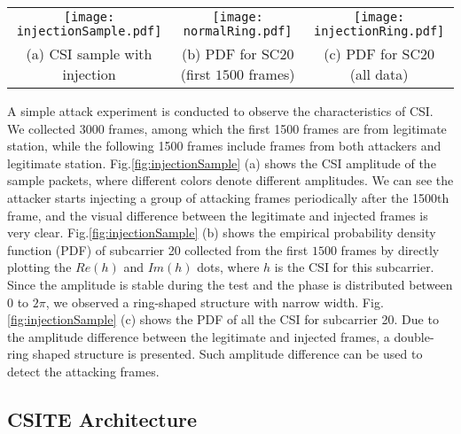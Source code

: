 \documentclass[conference]{IEEEtran}
\begin{document}
\begin{figure*}[!t]
\begin{center}
\begin{tabular}{ccc}
\texttt{[image: injectionSample.pdf]} \hspace{-0.3in} &
\texttt{[image: normalRing.pdf]} \hspace{-0.4in} &
\texttt{[image: injectionRing.pdf]} \\
(a) CSI sample with injection & (b) PDF for SC20 (first $1500$ frames) &
(c) PDF for SC20 (all data)
\end{tabular}
\end{center}
\caption{(a) Amplitude of CSI sample where warmer
  colors denote larger amplitudes. Attacking frames are injected
  starting from frame number $1500$.
(b)  PDF  for sub-carrier 20 of the first $1500$
   frames, where the value (denoted by colors) at a point is the
   number of frames with this CSI.
 (c)  PDF for  sub-carrier 20 of all samples, including attacking
   frames.}
\label{fig:injectionSample}
\vspace{-0.15in}
\end{figure*}

A simple attack experiment is conducted to observe the characteristics of CSI.
We collected 3000 frames, among which the first 1500 frames are from legitimate station, while the following 1500 frames include frames
 from both attackers and legitimate station. Fig.\ref{fig:injectionSample} (a) shows the
 CSI amplitude of the sample packets, where different colors denote
different amplitudes. We can see the attacker starts
injecting a group of attacking frames periodically after the 1500th frame, and the visual
difference between the legitimate and injected frames is very clear.
Fig.\ref{fig:injectionSample} (b) shows the empirical probability density function (PDF) of subcarrier 20 collected from the first $1500$ frames by directly plotting the $Re(h)$ and $Im(h)$ dots, where
 $h$ is the CSI for this subcarrier. Since the amplitude is stable during the test
 and the phase is distributed between $0$ to $2\pi$, we observed a ring-shaped structure with narrow width. Fig.\ref{fig:injectionSample} (c) shows the PDF of all the CSI for subcarrier 20. Due to the amplitude difference between the legitimate and injected frames, a double-ring shaped structure is presented. Such amplitude difference can be used to detect the attacking frames.


\subsection{CSITE Architecture}
\label{subsec:working-model}
\end{document}
